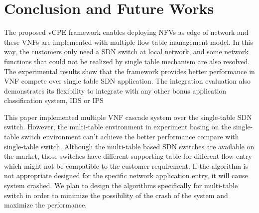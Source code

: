 \documentclass[conference]{IEEEtran}
\begin{document}
\section{Conclusion and Future Works}
The proposed vCPE framework enables deploying NFVs as edge of network and these VNFs are implemented with multiple flow table management model. In this way, the customers only need a SDN switch at local network, and some network functions that could not be realized by single table mechanism are also resolved. The experimental results show that the framework provides better performance in VNF compete over single table SDN application. The integration evaluation also demonstrates its flexibility to integrate with any other bonus application classification system, IDS or IPS

This paper implemented multiple VNF cascade system over the single-table SDN switch. However, the multi-table environment in experiment basing on the single-table switch environment can't achieve the better performance compare with single-table switch. Although the multi-table based SDN switches are available on the market, those switches have different supporting table for different flow entry which might not be compatible to the customer requirement. If the algorithm is not appropriate designed for the specific network application entry, it will cause system crashed. We plan to design the algorithms specifically for multi-table switch in order to minimize the possibility of the crash of the system and maximize the performance.



\end{document}
